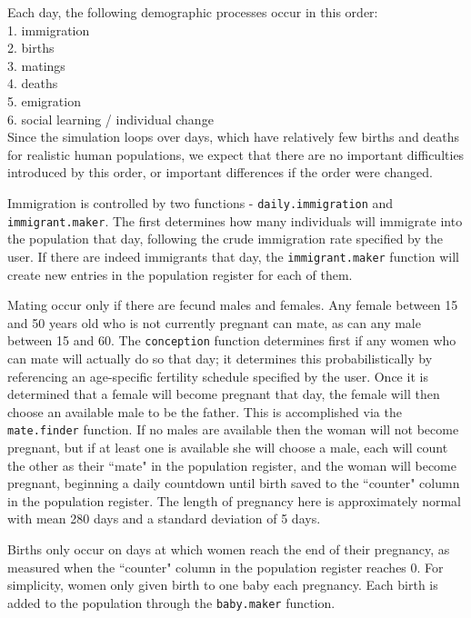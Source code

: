 Each day, the following demographic processes occur in this order:\\
1.	immigration \\
2.	births\\
3.	matings\\
4.	deaths\\
5.	emigration\\
6.	social learning / individual change\\

Since the simulation loops over days, which have relatively few births and deaths for realistic human populations, we expect that there are no important difficulties introduced by this order, or important differences if the order were changed.  

Immigration is controlled by two functions - \texttt{daily.immigration} and \\ \texttt{immigrant.maker}.  The first determines how many individuals will immigrate into the population that day, following the crude immigration rate specified by the user.  If there are indeed immigrants that day, the \texttt{immigrant.maker} function will create new entries in the population register for each of them. 

Mating occur only if there are fecund males and females.  Any female between 15 and 50 years old who is not currently pregnant can mate, as can any male between 15 and 60.  The \texttt{conception} function determines first if any women who can mate will actually do so that day; it determines this probabilistically by referencing an age-specific fertility schedule specified by the user.  Once it is determined that a female will become pregnant that day, the female will then choose an available male to be the father.  This is accomplished via the \texttt{mate.finder} function.  If no males are available then the woman will not become pregnant, but if at least one is available she will choose a male, each will count the other as their ``mate" in the population register, and the woman will become pregnant, beginning a daily countdown until birth saved to the ``counter" column in the population register.  The length of pregnancy here is approximately normal with mean 280 days and a standard deviation of 5 days.

Births only occur on days at which women reach the end of their pregnancy, as measured when the ``counter" column in the population register reaches 0.  For simplicity, women only given birth to one baby each pregnancy.  Each birth is added to the population through the \texttt{baby.maker} function.  

